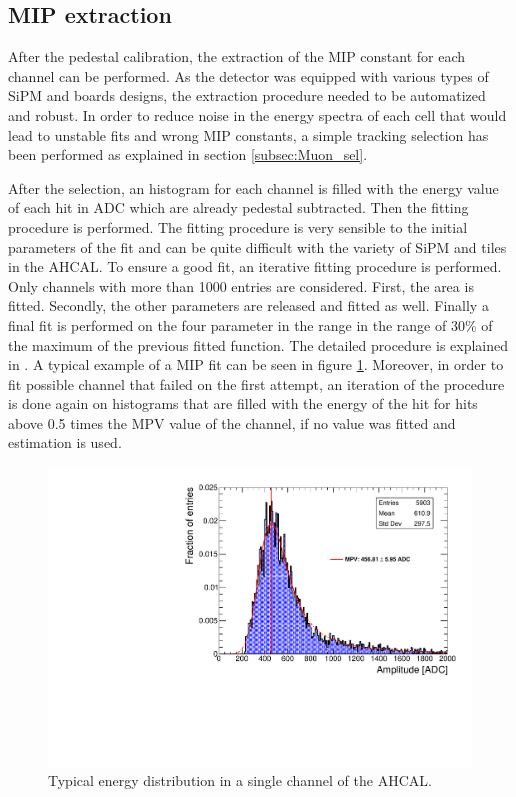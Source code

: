 \subsection{MIP extraction}

After the pedestal calibration, the extraction of the MIP constant for each channel can be performed. As the detector was equipped with various types of SiPM and boards designs, the extraction procedure needed to be automatized and robust. In order to reduce noise in the energy spectra of each cell that would lead to unstable fits and wrong MIP constants, a simple tracking selection has been performed as explained in section \ref{subsec:Muon_sel}.

After the selection, an histogram for each channel is filled with the energy value of each hit in ADC which are already pedestal subtracted. Then the fitting procedure is performed. The fitting procedure is very sensible to the initial parameters of the fit and can be quite difficult with the variety of SiPM and tiles in the AHCAL. To ensure a good fit, an iterative fitting procedure is performed. Only channels with more than 1000 entries are considered. First, the area is fitted. Secondly, the other parameters are released and fitted as well. Finally a final fit is performed on the four parameter in the range in the range of 30\% of the maximum of the previous fitted function. The detailed procedure is explained in \cite{FabianThesis}. A typical example of a MIP fit can be seen in figure \ref{fig:MIPFit}. Moreover, in order to fit possible channel that failed on the first attempt, an iteration of the procedure is done again on histograms that are filled with the energy of the hit for hits above 0.5 times the MPV value of the channel, if no value was fitted and estimation is used.

\begin{figure}[htbp!]
	\centering
	\includegraphics[width=0.7\linewidth]{../Thesis_Plots/EnergyCalib/Plots/ExampleMIP_Module3.pdf}
	\caption{Typical energy distribution in a single channel of the AHCAL.} \label{fig:MIPFit}
\end{figure}

